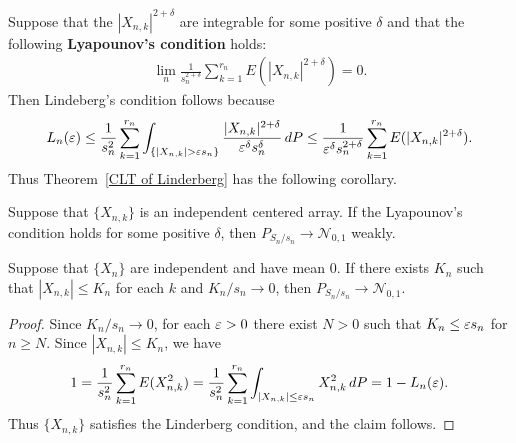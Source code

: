 Suppose that the $|X_{n,k}|^{2+\delta}$ are integrable for some positive $\delta$ and that the following \textbf{Lyapounov's condition} holds:
\begin{align}\label{Lyapounov's condition}
\lim_n\frac{1}{s_n^{2+\delta}}\sum_{k=1}^{r_n}E(|X_{n,k}|^{2+\delta})=0.
\end{align}
Then Lindeberg's condition follows because
\begin{equation*}\label{Lyapounov imply Lindeberg}
\begin{aligned}
L_n(\eps)\leq\frac{1}{s_n^2}\sum_{k=1}^{r_n}\int_{\{|X_{n,k}|>\eps s_n\}}\frac{|X_{n,k}|^{2+\delta}}{\eps^\delta s_n^\delta}\,dP\leq\frac{1}{\eps^\delta s_n^{2+\delta}}\sum_{k=1}^{r_n}E(|X_{n,k}|^{2+\delta}).
\end{aligned}
\end{equation*}
Thus Theorem~\ref{CLT of Linderberg} has the following corollary.
\begin{corollary}
Suppose that $\{X_{n,k}\}$ is an independent centered array. If the Lyapounov's condition holds for some positive $\delta$, then $P_{S_n/s_n}\to \mathcal{N}_{0,1}$ weakly.
\end{corollary}
\begin{proposition}
Suppose that $\{X_n\}$ are independent and have mean $0$. If there exists $K_n$ such that $|X_{n,k}|\leq K_n$ for each $k$ and $K_n/s_n\to 0$, then $P_{S_n/s_n}\to \mathcal{N}_{0,1}$.
\end{proposition}
\begin{proof}
Since $K_n/s_n\to 0$, for each $\varepsilon>0$ there exist $N>0$ such that $K_n\leq\varepsilon s_n$ for $n\geq N$. Since $|X_{n,k}|\leq K_n$, we have
\[1=\frac{1}{s_n^2}\sum_{k=1}^{r_n}E(X_{n,k}^2)=\frac{1}{s_n^2}\sum_{k=1}^{r_n}\int_{|X_{n,k}|\leq\varepsilon s_n}X_{n,k}^2\,dP=1-L_n(\varepsilon).\]
Thus $\{X_{n,k}\}$ satisfies the Linderberg condition, and the claim follows.
\end{proof}


